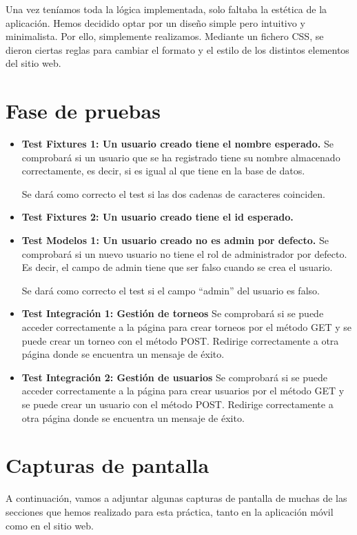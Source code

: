 \documentclass{article}
\begin{document}
Una vez teníamos toda la lógica implementada, solo faltaba la estética de la aplicación. Hemos decidido optar por un diseño simple pero intuitivo y minimalista. Por ello,
simplemente realizamos. Mediante un fichero CSS, se dieron ciertas reglas para cambiar el formato y el estilo de los distintos elementos del sitio web.

\section{Fase de pruebas}
\begin{itemize}
  \item \textbf{Test Fixtures 1: Un usuario creado tiene el nombre esperado.}
  Se comprobará si un usuario que se ha registrado tiene su nombre almacenado correctamente, es decir,
  si es igual al que tiene en la base de datos.

  Se dará como correcto el test si las dos cadenas de caracteres coinciden.

  \item \textbf{Test Fixtures 2: Un usuario creado tiene el id esperado.}
  
  \item \textbf{Test Modelos 1: Un usuario creado no es admin por defecto.}
  Se comprobará si un nuevo usuario no tiene el rol de administrador por defecto. Es decir,
  el campo de admin tiene que ser falso cuando se crea el usuario.

  Se dará como correcto el test si el campo ``admin'' del usuario es falso. 

  \item \textbf{Test Integración 1: Gestión de torneos} Se comprobará si se puede acceder correctamente a la página para crear torneos por el método GET y
   se puede crear un torneo con el método POST. Redirige correctamente a otra página donde se encuentra un mensaje de éxito.
   \item \textbf{Test Integración 2: Gestión de usuarios} Se comprobará si se puede acceder correctamente a la página para crear usuarios por el método GET y
   se puede crear un usuario con el método POST. Redirige correctamente a otra página donde se encuentra un mensaje de éxito.

\end{itemize}

\section{Capturas de pantalla}
A continuación, vamos a adjuntar algunas capturas de pantalla de muchas de las secciones que hemos realizado para esta práctica, tanto en la aplicación móvil como en el sitio web.
\end{document}
